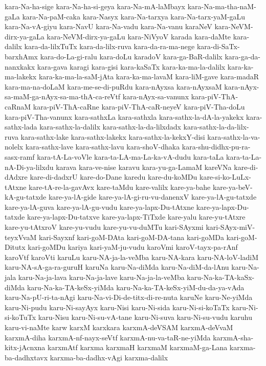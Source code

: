 {kara-Na-ha-sige
kara-Na-ha-si-geya
kara-Na-mA-laMbayx
kara-Na-ma-tha-naM-gaLa
kara-Na-paM-caka
kara-Nasyx
kara-Na-tarxya
kara-Na-tarx-yaM-gaLu
kara-Na-vA-giyu
kara-NavU
kara-Na-vadu
kara-Na-vanu
karaNeV
kara-NeVM-dirx-ya-gaLa
kara-NeVM-dirx-ya-gaLu
kara-NiVyoV
karada
kara-daMte
kara-dalilx
kara-da-lilxTuTx
kara-da-lilx-ruva
kara-da-ra-ma-nege
kara-di-SaTx-barxhAmx
kara-do-La-gi-ralu
kara-doLu
karadoV
kara-ga-BaR-dalilx
kara-ga-da-nanxkakx
kara-gava
karagi
kara-gisi
kara-kaSaTx
kara-ka-ma-la-dalilx
kara-ka-ma-lakekx
kara-ka-ma-la-saM-jAta
kara-ka-ma-lavaM
kara-liM-gave
kara-madaR
kara-ma-na-doLaM
kara-me-se-di-puRdu
kara-nAyxsa
kara-nAyxsaM
kara-nAyx-sa-maM-ga-nAyx-sa-ma-thA-ca-reVtf
kara-nAyx-sa-vanunx
kara-piV-ThA-caRnaM
kara-piV-ThA-caRne
kara-piV-ThA-caR-neyeV
kara-piV-Tha-doLu
kara-piV-Tha-vanunx
kara-sathxLa
kara-sathxla
kara-sathx-la-dA-la-yakekx
kara-sathx-lada
kara-sathx-la-dalilx
kara-sathx-la-da-lilxdadx
kara-sathx-la-da-lilx-ruva
kara-sathx-lake
kara-sathx-lakekx
kara-sathx-la-kekxY-disi
kara-sathx-la-va-nolelx
kara-sathx-lave
kara-sathx-lavu
kara-shoV-dhaka
kara-shu-didhx-pu-ra-sasx-ramf
kara-tA-La-voVle
kara-ta-LA-ma-La-ka-vA-dudu
kara-taLa
kara-ta-La-nA-Di-ya-lilxdu
karava
kara-ve-nise
karavu
kara-yu-ga-LamaM
kareVNa
kare-di-dAdxre
kare-di-dadxrU
kare-do-Dane
karedu
kare-du-koMDu
kare-si-ko-LuLx-tAtxne
kare-tA-re-la-gavAvx
kare-taMdu
kare-valilx
kare-ya-bahe
kare-ya-beV-kA-gu-tatxde
kare-ya-lA-gide
kare-ya-lA-gi-ru-vu-danenxV
kare-ya-lA-gu-tatxde
kare-ya-lA-guva
kare-ya-lA-gu-vudu
kare-ya-lapx-Du-tAtxne
kare-ya-lapx-Du-tatxde
kare-ya-lapx-Du-tatxve
kare-ya-lapx-TiTxde
kare-yalu
kare-yu-tAtxre
kare-yu-tAtxroV
kare-yu-vudu
kare-yu-vu-duMTu
kari-SAyxmi
kari-SAyx-miV-teyxVvaM
kari-Sayxnf
kari-goM-DAta
kari-goM-DA-tana
kari-goMDa
kari-goM-Ditutx
kari-goMDu
kariya
kari-yaM-ju-vudu
karoVmi
karoV-tayx-pa-rAnf
karoVtf
karoVti
karuLu
karu-NA-ja-la-veMba
karu-NA-kara
karu-NA-loV-ladiM
karu-NA-sA-ga-ra-guruH
karuNa
karu-Na-diMda
karu-Na-diM-da-lAnu
karu-Na-jala
karu-Na-ja-lava
karu-Na-ja-lave
karu-Na-ja-la-veMba
karu-Na-ka-TA-kaSx-diMda
karu-Na-ka-TA-keSx-yiMda
karu-Na-ka-TA-keSx-yiM-du-da-ya-vAda
karu-Na-pU-ri-ta-nAgi
karu-Na-vi-Di-de-titx-di-re-nuta
karuNe
karu-Ne-yiMda
karu-Ni-pudu
karu-Ni-sayAyx
karu-Nisi
karu-Ni-sida
karu-Ni-si-koTaTx
karu-Ni-si-koTuTx
karu-Nisu
karu-Ni-su-vA-tane
karu-Ni-suva
karu-Ni-su-vudu
karuhu
karu-vi-naMte
karw
karxM
karxkara
karxmA-deVSAM
karxmA-deVvaM
karxmA-diha
karxmA-nf-nayx-seVtf
karxmA-nu-va-taR-ne-yiMda
karxmA-sha-kitx-jAcnxna
karxmAtf
karxma
karxmaH
karxmaM
karxmaM-ga-Lana
karxma-ba-dadhxtavx
karxma-ba-dadhx-vAgi
karxma-dalilx
}
